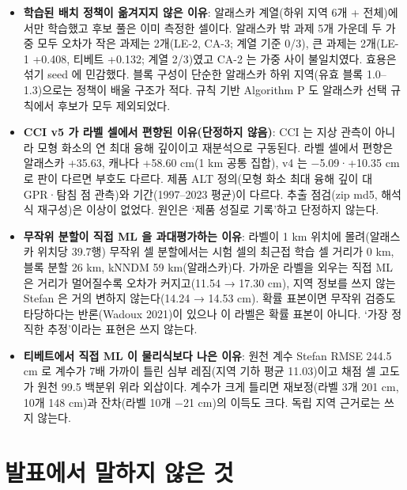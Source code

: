 \begin{itemize}[leftmargin=1.4em, itemsep=0.25em]
  \item \textbf{학습된 배치 정책이 옮겨지지 않은 이유}: 알래스카 계열(하위 지역 6개 + 전체)에서만 학습했고 후보 풀은 이미 측정한 셀이다. 알래스카 밖 과제 5개 가운데 두 가중 모두 오차가 작은 과제는 2개(LE-2, CA-3; 계열 기준 0/3), 큰 과제는 2개(LE-1 +0.408, 티베트 +0.132; 계열 2/3)였고 CA-2 는 가중 사이 불일치였다. 효용은 섞기 seed 에 민감했다. 블록 구성이 단순한 알래스카 하위 지역(유효 블록 1.0–1.3)으로는 정책이 배울 구조가 적다. 규칙 기반 Algorithm P 도 알래스카 선택 규칙에서 후보가 모두 제외되었다.
  \item \textbf{CCI v5 가 라벨 셀에서 편향된 이유(단정하지 않음)}: CCI 는 지상 관측이 아니라 모형 화소의 연 최대 융해 깊이이고 재분석으로 구동된다. 라벨 셀에서 편향은 알래스카 +35.63, 캐나다 +58.60 cm(1 km 공통 집합), v4 는 −5.09·+10.35 cm 로 판이 다르면 부호도 다르다. 제품 ALT 정의(모형 화소 최대 융해 깊이 대 GPR·탐침 점 관측)와 기간(1997–2023 평균)이 다르다. 추출 점검(zip md5, 해석식 재구성)은 이상이 없었다. 원인은 ‘제품 성질로 기록’하고 단정하지 않는다.
  \item \textbf{무작위 분할이 직접 ML 을 과대평가하는 이유}: 라벨이 1 km 위치에 몰려(알래스카 위치당 39.7행) 무작위 셀 분할에서는 시험 셀의 최근접 학습 셀 거리가 0 km, 블록 분할 26 km, kNNDM 59 km(알래스카)다. 가까운 라벨을 외우는 직접 ML 은 거리가 멀어질수록 오차가 커지고(11.54 → 17.30 cm), 지역 정보를 쓰지 않는 Stefan 은 거의 변하지 않는다(14.24 → 14.53 cm). 확률 표본이면 무작위 검증도 타당하다는 반론(Wadoux 2021)이 있으나 이 라벨은 확률 표본이 아니다. ‘가장 정직한 추정’이라는 표현은 쓰지 않는다.
  \item \textbf{티베트에서 직접 ML 이 물리식보다 나은 이유}: 원천 계수 Stefan RMSE 244.5 cm 로 계수가 7배 가까이 틀린 심부 레짐(지역 기하 평균 11.03)이고 채점 셀 고도가 원천 99.5 백분위 위라 외삽이다. 계수가 크게 틀리면 재보정(라벨 3개 201 cm, 10개 148 cm)과 잔차(라벨 10개 −21 cm)의 이득도 크다. 독립 지역 근거로는 쓰지 않는다.
\end{itemize}

\section{발표에서 말하지 않은 것}

